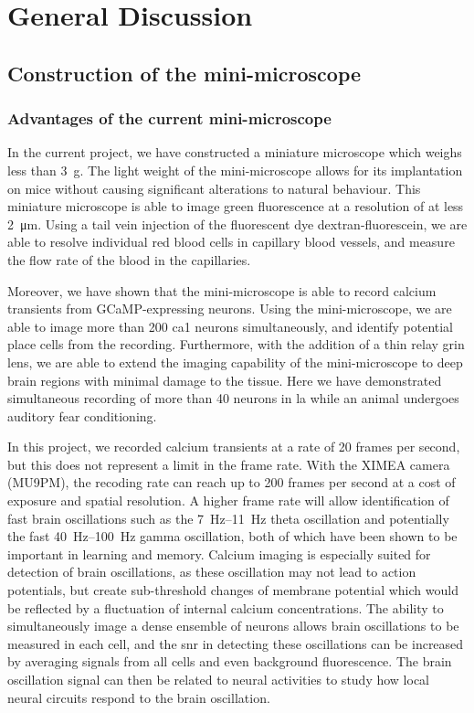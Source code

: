 \chapter{General Discussion}
\section{Construction of the mini-microscope}
\subsection{Advantages of the current mini-microscope}
In the current project, we have constructed a miniature microscope which weighs less than \SI{3}{\gram}. The light weight of the mini-microscope allows for its implantation on mice without causing significant alterations to natural behaviour.  This miniature microscope is able to image green fluorescence at a resolution of at less \SI{2}{\um}. Using a tail vein injection of the fluorescent dye dextran-fluorescein, we are able to resolve individual red blood cells in capillary blood vessels, and measure the flow rate of the blood in the capillaries. 

Moreover, we have shown that the mini-microscope is able to record calcium transients from GCaMP-expressing neurons. Using the mini-microscope, we are able to image more than \num{200} \gls{ca1} neurons simultaneously, and identify potential place cells from the recording. Furthermore, with the addition of a thin relay \gls{grin} lens, we are able to extend the imaging capability of the mini-microscope to deep brain regions with minimal damage to the tissue. Here we have demonstrated simultaneous recording of more than \num{40} neurons in \gls{la} while an animal undergoes auditory fear conditioning. 

In this project, we recorded calcium transients at a rate of \num{20} frames per second, but this does not represent a limit in the frame rate. With the XIMEA camera (MU9PM), the recoding rate can reach up to \num{200} frames per second at a cost of exposure and spatial resolution. A higher frame rate will allow identification of fast brain oscillations such as the \SIrange{7}{11}{\hertz} theta oscillation and potentially the fast \SIrange{40}{100}{\hertz} gamma oscillation, both of which have been shown to be important in learning and memory. Calcium imaging is especially suited for detection of brain oscillations, as these oscillation may not lead to action potentials, but create sub-threshold changes of membrane potential which would be reflected by a fluctuation of internal calcium concentrations. The ability to simultaneously image a dense ensemble of neurons allows brain oscillations to be measured in each cell, and the \gls{snr} in detecting these oscillations can be increased by averaging signals from all cells and even background fluorescence. The brain oscillation signal can then be related to neural activities to study how local neural circuits respond to the brain oscillation. 

